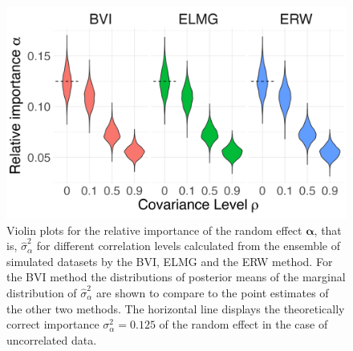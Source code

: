 \begin{figure}[ht]
  \centering
  \includegraphics[width=0.7\linewidth]{Figures/ViolinPlots/Variance_gamma.png}
  \caption{Violin plots for the relative importance of the random effect $\boldsymbol{\alpha}$, that is, $\hat{\sigma}^2_{\alpha}$ for different correlation levels calculated from the ensemble of simulated datasets by the BVI, ELMG and the ERW method. For the BVI method the distributions of posterior means of the marginal distribution of $\hat{\sigma}^2_{\alpha}$ are shown to compare to the point estimates of the other two methods. The horizontal line displays the theoretically correct importance $\sigma^2_{\alpha} = 0.125$ of the random effect in the case of uncorrelated data.}
  \label{fig:relimp_alpha}
\end{figure}

